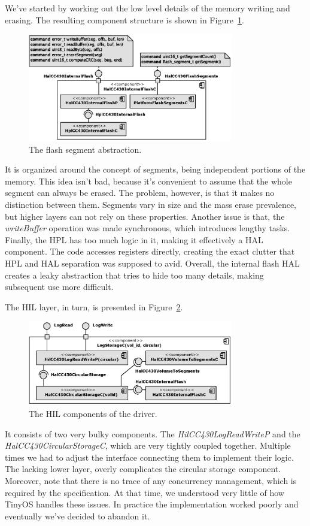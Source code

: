 We've started by working out the low level details of the memory writing and erasing. The resulting component structure is shown in Figure~\ref{fig:hal_cc430_internal_flash_c}.
\begin{figure}[h]
  \centering
  \includegraphics[width=0.8\textwidth]{diagrams/hal_cc430_internal_flash_c.eps}
  \caption{The flash segment abstraction.}
  \label{fig:hal_cc430_internal_flash_c}
\end{figure}
It is organized around the concept of segments, being independent portions of the memory. This idea isn't bad, because it's convenient to assume that the whole segment can always be erased. The problem, however, is that it makes no distinction between them. Segments vary in size and the mass erase prevalence, but higher layers can not rely on these properties. Another issue is that, the \emph{writeBuffer} operation was made synchronous, which introduces lengthy tasks. Finally, the HPL has too much logic in it, making it effectively a HAL component. The code accesses registers directly, creating the exact clutter that HPL and HAL separation was supposed to avid. Overall, the internal flash HAL creates a leaky abstraction that tries to hide too many details, making subsequent use more difficult.

The HIL layer, in turn, is presented in Figure~\ref{fig:log_storage_c}.
\begin{figure}[h]
  \centering
  \includegraphics[width=0.8\textwidth]{diagrams/log_storage_c.eps}
  \caption{The HIL components of the driver.}
  \label{fig:log_storage_c}
\end{figure}
It consists of two very bulky components. The \emph{HilCC430LogReadWriteP} and the \emph{HalCC430CircularStorageC}, which are very tightly coupled together.
Multiple times we had to adjust the interface connecting them to implement their logic. The lacking lower layer, overly complicates the circular storage component. Moreover, note that there is no trace of any concurrency management, which is required by the specification. At that time, we understood very little of how TinyOS handles these issues. In practice the implementation worked poorly and eventually we've decided to abandon it.

